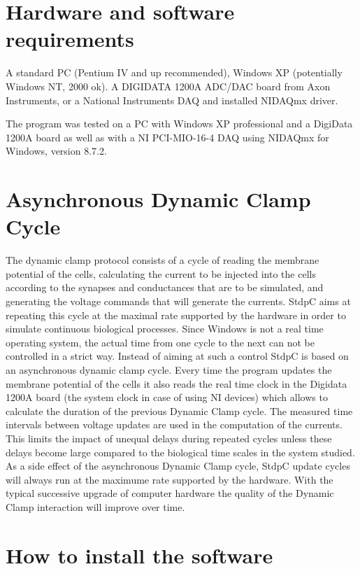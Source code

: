 \documentclass{article}
\begin{document}
\section{Hardware and software requirements} 
 
A standard PC (Pentium IV and up recommended), Windows XP (potentially
Windows NT, 2000 ok). A DIGIDATA 1200A ADC/DAC board from Axon
Instruments, or a National Instruments DAQ and installed NIDAQmx
driver.

The program was tested on a PC with Windows XP professional and a
DigiData 1200A board as well as with a NI PCI-MIO-16-4 DAQ using NIDAQmx for
Windows, version 8.7.2.

\section{Asynchronous Dynamic Clamp Cycle}
 
The dynamic clamp protocol consists of a cycle of reading the membrane
potential of the cells, calculating the current to be injected into
the cells according to the synapses and conductances that are to be
simulated, and generating the voltage commands that will generate the
currents. StdpC aims at repeating this cycle at the maximal rate
supported by the hardware in order to simulate continuous biological
processes. Since Windows is not a real time operating system, the
actual time from one cycle to the next can not be controlled in a
strict way. Instead of aiming at such a control StdpC is based on an
asynchronous dynamic clamp cycle.  Every time the program updates the
membrane potential of the cells it also reads the real time clock in
the Digidata 1200A board (the system clock in case of using NI
devices) which allows to calculate the duration of the previous
Dynamic Clamp cycle. The measured time intervals between voltage
updates are used in the computation of the currents. This limits the
impact of unequal delays during repeated cycles unless these delays
become large compared to the biological time scales in the system
studied. As a side effect of the asynchronous Dynamic Clamp cycle,
StdpC update cycles will always run at the maximume rate supported by
the hardware. With the typical successive upgrade of computer hardware
the quality of the Dynamic Clamp interaction will improve over time.


\section{How to install the software}
\end{document}
